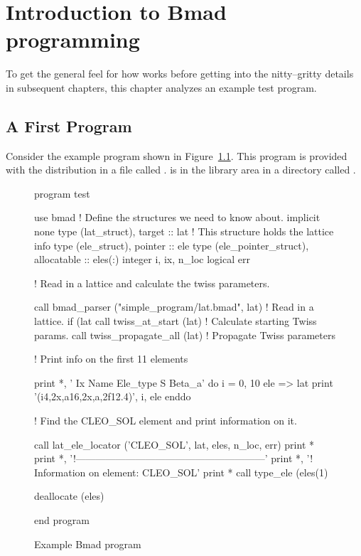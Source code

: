 \chapter{Introduction to Bmad programming}
\label{c:program.info}

To get the general feel for how \bmad works before
getting into the nitty--gritty details in subsequent chapters, this
chapter analyzes an example test program.

\section{A First Program}
\label{s:first.program}

Consider the example program shown in Figure~\ref{f:program}.
This program is provided with the \bmad distribution in a file called
.  is in the 
library area in a directory called .

\begin{figure}[htp]
\begin{listing}{1}
program test

  use bmad                 ! Define the structures we need to know about.
  implicit none
  type (lat_struct), target :: lat   ! This structure holds the lattice info
  type (ele_struct), pointer :: ele
  type (ele_pointer_struct), allocatable :: eles(:)
  integer i, ix, n_loc
  logical err

  ! Read in a lattice and calculate the twiss parameters.

  call bmad_parser ("simple_program/lat.bmad", lat) ! Read in a lattice.
  if (lat%
           call twiss_at_start (lat)  ! Calculate starting Twiss params.
  call twiss_propagate_all (lat)      ! Propagate Twiss parameters

  ! Print info on the first 11 elements

  print *, ' Ix  Name              Ele_type                   S      Beta_a'
  do i = 0, 10
    ele => lat%
    print '(i4,2x,a16,2x,a,2f12.4)', i, ele%
  enddo

  ! Find the CLEO_SOL element and print information on it.

  call lat_ele_locator ('CLEO_SOL', lat, eles, n_loc, err)
  print *
  print *, '!---------------------------------------------------------'
  print *, '! Information on element: CLEO_SOL'
  print *
  call type_ele (eles(1)%

  deallocate (eles)

end program
\end{listing}
\caption{Example Bmad program}
\label{f:program}
\end{figure}

